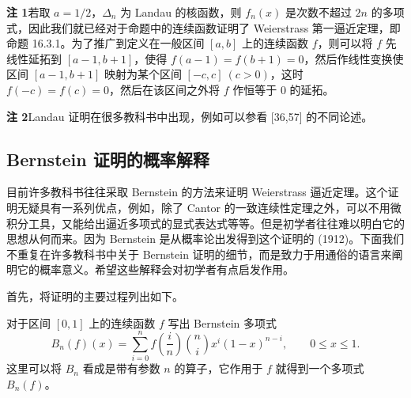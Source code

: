 \begin{xremark}
\textbf{注 1}\quad 若取 $a=1/2$，$\Delta_n$ 为 Landau 的核函数，则 $f_n(x)$ 是次数不超过 $2n$ 的多项式，因此我们就已经对于命题中的连续函数证明了 Weierstrass 第一逼近定理，即命题 16.3.1。为了推广到定义在一般区间 $[a,b]$ 上的连续函数 $f$，则可以将 $f$ 先线性延拓到 $[a-1,b+1]$，使得 $f(a-1)=f(b+1)=0$，然后作线性变换使区间 $[a-1,b+1]$ 映射为某个区间 $[-c,c]\ (c>0)$，这时 $f(-c)=f(c)=0$，然后在该区间之外将 $f$ 作恒等于 0 的延拓。

\textbf{注 2}\quad Landau 证明在很多教科书中出现，例如可以参看 [36,57] 的不同论述。
\end{xremark}

\subsection{Bernstein 证明的概率解释}

目前许多教科书往往采取 Bernstein 的方法来证明 Weierstrass 逼近定理。这个证明无疑具有一系列优点，例如，除了 Cantor 的一致连续性定理之外，可以不用微积分工具，又能给出逼近多项式的显式表达式等等。但是初学者往往难以明白它的思想从何而来。因为 Bernstein 是从概率论出发得到这个证明的 (1912)。下面我们不重复在许多教科书中关于 Bernstein 证明的细节，而是致力于用通俗的语言来阐明它的概率意义。希望这些解释会对初学者有点启发作用。

首先，将证明的主要过程列出如下。

对于区间 $[0,1]$ 上的连续函数 $f$ 写出 Bernstein 多项式
\begin{equation}
  B_n(f)(x)=\sum_{i=0}^n f\left(\frac in\right)\binom ni x^i(1-x)^{n-i},
  \qquad 0\leqslant x\leqslant1.
\tag{16.16}
\label{eq:16.16}
\end{equation}
这里可以将 $B_n$ 看成是带有参数 $n$ 的算子，它作用于 $f$ 就得到一个多项式 $B_n(f)$。

